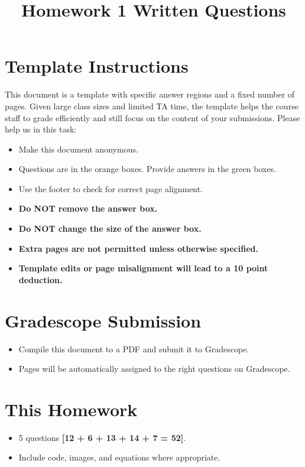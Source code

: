 \documentclass[11pt]{article}
\date{}
\title{\vspace{-1cm}Homework 1 Written Questions}
\begin{document}
\maketitle
\thispagestyle{fancy}

\section*{Template Instructions}

This document is a template with specific answer regions and a fixed number of pages. Given large class sizes and limited TA time, the template helps the course staff to grade efficiently and still focus on the content of your submissions. Please help us in this task:
 
\begin{itemize}
  \item Make this document anonymous.
  
  \item Questions are in the orange boxes. Provide answers in the green boxes.
  \item Use the footer to check for correct page alignment.

  \item \textbf{Do NOT remove the answer box.}
  \item \textbf{Do NOT change the size of the answer box.}
  \item \textbf{Extra pages are not permitted unless otherwise specified.}
  \item \textbf{Template edits or page misalignment will lead to a 10 point deduction.}
\end{itemize}

\section*{Gradescope Submission}
\begin{itemize}
  \item Compile this document to a PDF and submit it to Gradescope.
  \item Pages will be automatically assigned to the right questions on Gradescope.
\end{itemize}

\section*{This Homework}
\begin{itemize}
    \item 5 questions \textbf{[12 + 6 + 13 + 14 + 7 = 52]}.
    \item Include code, images, and equations where appropriate.
\end{itemize}
\end{document}
